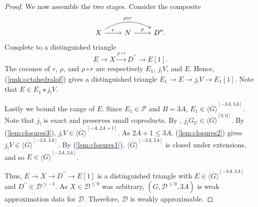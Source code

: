 \documentclass[11pt]{amsart}
\def\eqref#1{\textcolor{darkblue}{(\ref{#1})}}
\theoremstyle{plain}
\theoremstyle{definition}
\numberwithin{equation}{section}
\numberwithin{theorem}{section}
\begin{document}
\begin{proof}
    We now assemble the two stages.
    Consider the composite
    \begin{displaymath}
        \begin{tikzcd}
            X \ar[r, "r"] \ar[rr, bend left=30, "\rho\circ r"] & N \ar[r, "\rho"] & D^{\prime\prime}.
        \end{tikzcd}
    \end{displaymath}
    Complete to a distinguished triangle
    \begin{displaymath}
        E\to X\xrightarrow{\rho\circ r} D^{\prime\prime}\to E[1].
    \end{displaymath}
    The cocones of $r$, $\rho$, and $\rho\circ r$ are respectively $E_1$, $j_! V$, and $E$.
    Hence, \eqref{rmk:octahedralof} gives a distinguished triangle $E_1\to E\to j_! V\to E_1[1]$.
    Note that $E\in E_1\star j_! V$.

    Lastly we bound the range of $E$.
    Since $E_1\in \mathcal{P}$ and $B = 3A$, $E_1\in \overline{\langle G\rangle}^{[-3A,3A]}$.
    Note that $j_!$ is exact and preserves small coproducts.
    By , $j_! G_U\in \overline{\langle G\rangle}^{[0,0]}$.
    By \eqref{lem:closures3}, $j_! V\in \overline{\langle G\rangle}^{[-A,2A+1]}$.
    As $2A+1\leq 3A$, \eqref{lem:closures2} gives $j_! V\in \overline{\langle G\rangle}^{[-3A,3A]}$.
    By \eqref{lem:closures1}, $\overline{\langle G\rangle}^{[-3A,3A]}$ is closed under extensions, and so $E\in \overline{\langle G\rangle}^{[-3A,3A]}$.

    Thus, $E\to X\to D^{\prime\prime}\to E[1]$ is a distinguished triangle with $E\in \overline{\langle G\rangle}^{[-3A,3A]}$ and $D^{\prime\prime}\in \mathcal{D}^{\leq -1}$.
    As $X\in \mathcal{D}^{\leq 0}$ was arbitrary, $(G,\mathcal{D}^{\leq 0},3A)$ is weak approximation data for $\mathcal{D}$.
    Therefore, $\mathcal{D}$ is weakly approximable.
\end{proof}
\end{document}
